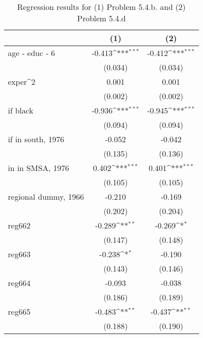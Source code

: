 \begin{table}[htbp]\centering
\def\sym#1{\ifmmode^{#1}\else\(^{#1}\)\fi}
\caption{Regression results for (1) Problem 5.4.b. and (2) Problem 5.4.d}
\begin{tabular}{l*{2}{c}}
\toprule
                    &\multicolumn{1}{c}{(1)}         &\multicolumn{1}{c}{(2)}         \\
\midrule
age - educ - 6      &      -0.413\sym{***}&      -0.412\sym{***}\\
                    &     (0.034)         &     (0.034)         \\
\addlinespace
exper^2             &       0.001         &       0.001         \\
                    &     (0.002)         &     (0.002)         \\
\addlinespace
=1 if black         &      -0.936\sym{***}&      -0.945\sym{***}\\
                    &     (0.094)         &     (0.094)         \\
\addlinespace
=1 if in south, 1976&      -0.052         &      -0.042         \\
                    &     (0.135)         &     (0.136)         \\
\addlinespace
=1 in in SMSA, 1976 &       0.402\sym{***}&       0.401\sym{***}\\
                    &     (0.105)         &     (0.105)         \\
\addlinespace
regional dummy, 1966&      -0.210         &      -0.169         \\
                    &     (0.202)         &     (0.204)         \\
\addlinespace
reg662              &      -0.289\sym{**} &      -0.269\sym{*}  \\
                    &     (0.147)         &     (0.148)         \\
\addlinespace
reg663              &      -0.238\sym{*}  &      -0.190         \\
                    &     (0.143)         &     (0.146)         \\
\addlinespace
reg664              &      -0.093         &      -0.038         \\
                    &     (0.186)         &     (0.189)         \\
\addlinespace
reg665              &      -0.483\sym{**} &      -0.437\sym{**} \\
                    &     (0.188)         &     (0.190)         \\

\end{tabular}
\end{table}
